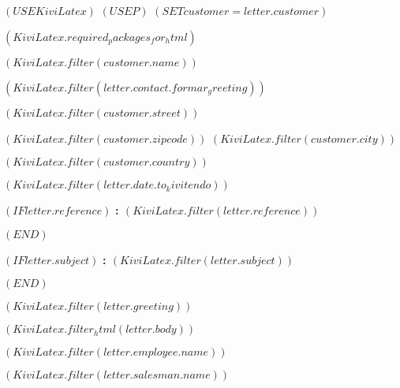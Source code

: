 $( USE KiviLatex )$
$( USE P )$
$( SET customer = letter.customer )$

$( KiviLatex.required_packages_for_html )$

\newcommand{\lxlangcode}{$(template_meta.language.template_code)$}
\newcommand{\lxmedia}{$(template_meta.media)$}
\newcommand{\lxcurrency}{}
\newcommand{\lxtitlebar}{}



\ourhead{}{}{}{}{}



\fontsize{10pt}{12pt}\selectfont

\vspace*{1cm}

\begin{minipage}{14cm}

  $( KiviLatex.filter(customer.name) )$

  $( KiviLatex.filter(letter.contact.formar_greeting) )$

  $( KiviLatex.filter(customer.street) )$

  $( KiviLatex.filter(customer.zipcode) )$ $( KiviLatex.filter(customer.city) )$

  $( KiviLatex.filter(customer.country) )$

\end{minipage}

\vspace{2.5cm}
\hfill $( KiviLatex.filter(letter.date.to_kivitendo) )$

$( IF letter.reference )$
\textbf{\ihrzeichen : $( KiviLatex.filter(letter.reference) )$}

\vspace{1cm}
$( END )$

$( IF letter.subject )$
\textbf{\betreff : $( KiviLatex.filter(letter.subject) )$}

\vspace{1cm}
$( END )$

$( KiviLatex.filter(letter.greeting) )$

\vspace{0.5cm}

$( KiviLatex.filter_html(letter.body) )$

\vspace{0.5cm}

\begin{minipage}{6cm}

\textbf{$( KiviLatex.filter(letter.employee.name) )$}

\end{minipage}
\begin{minipage}{6cm}

\textbf{$( KiviLatex.filter(letter.salesman.name) )$}

\end{minipage}


